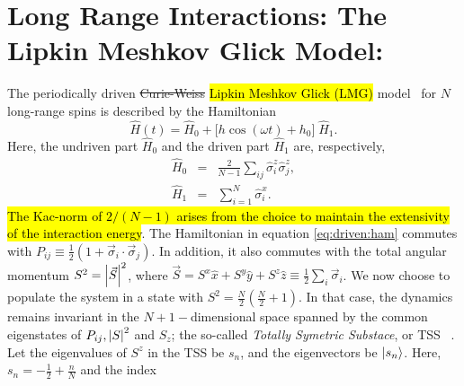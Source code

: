 \documentclass[%
reprint,
superscriptaddress,
linenumbers,
amsmath,amssymb,
aps,
prb,
showkeys,
]{revtex4-2}
\begin{document}
	\section{\label{sec:level3}Long Range Interactions: The Lipkin Meshkov Glick Model: }	
	The periodically driven \st{Curie-Weiss} \hl{Lipkin Meshkov Glick (LMG)} model~\cite{lmg1965_1,defenu2018} for $N$ long-range spins is described by the Hamiltonian
	\begin{equation}
		\hat{H}(t) = \hat{H}_0 + \big[h \cos{(\omega t)} + h_0\big]\; \hat{H}_1.
		\label{eq:driven:ham}
	\end{equation}
	Here, the undriven part $\hat{H}_0$ and the driven part $\hat{H}_1$ are, respectively, 
	\begin{eqnarray}
		\hat{H}_0 &=& \frac{2}{N-1} \sum_{ij}\hat{\sigma}^z_i\hat{\sigma}^z_j,\nonumber \\
		\hat{H}_1 &=& \sum^N_{i=1}\hat{\sigma}^x_i.
	\end{eqnarray}
	\hl{The Kac-norm of $2/(N-1)$ arises from the choice to maintain the extensivity of the interaction energy}. The Hamiltonian in equation \ref{eq:driven:ham} commutes with $P_{ij} \equiv \displaystyle\frac{1}{2}\left(1+ \vec{\sigma}_i\cdot\vec{\sigma}_j\right)$. In addition, it also commutes with the total angular momentum $S^2 = \abs{\vec{S}}^2$, where $\vec{S}=S^x\hat{x}+S^y\hat{y}+S^z\hat{z}\equiv\frac12 \sum_i \vec{\sigma}_i$. We now choose to populate the system in a state with $S^2=\displaystyle\frac{N}{2}\left(\frac{N}{2}+1\right)$. In that case, the dynamics remains invariant in the  $N+1-$dimensional space spanned by the common eigenstates of $P_{ij}, \abs{S}^2$ and $S_z$; the so-called \textit{ Totally Symetric Substace}, or TSS ~\cite{mori_prethermalization_2019}. Let the eigenvalues of $S^z$ in the TSS be $s_n$, and the eigenvectors be $\ket{s_n}$. Here, $s_n=-\frac{1}{2}+\frac{n}{N}$ and the index
\end{document}
